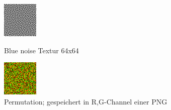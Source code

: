 \begin{figure}[H]\label{pic:Retargeting}
    \centering
    \begin{minipage}[t]{0.45\linewidth}
        \centering
        \includegraphics[interpolate=false,width=\linewidth]{content/simulatedAnnealing/Bilder/LDR_RGBA_0_64-RGBA_r_channel.png}
        \caption{Blue noise Textur 64x64}
    \end{minipage}
    \hfill
    \begin{minipage}[t]{0.45\linewidth}
        \centering
        \includegraphics[interpolate=false,width=\linewidth]{content/simulatedAnnealing/Bilder/permutation_texture_228324_swapsKirkpatrickCooldownSchedule.png}
        \caption{Permutation; gespeichert in R,G-Channel einer PNG}
    \end{minipage}
\end{figure}


